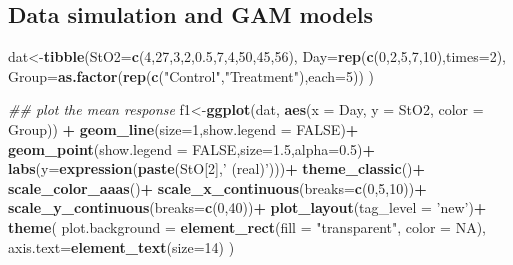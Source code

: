 \documentclass[
]{article}
\newenvironment{Shaded}{\begin{snugshade}}{\end{snugshade}}
\newcommand{\CommentTok}[1]{\textcolor[rgb]{0.56,0.35,0.01}{\textit{#1}}}
\newcommand{\DataTypeTok}[1]{\textcolor[rgb]{0.13,0.29,0.53}{#1}}
\newcommand{\DecValTok}[1]{\textcolor[rgb]{0.00,0.00,0.81}{#1}}
\newcommand{\FloatTok}[1]{\textcolor[rgb]{0.00,0.00,0.81}{#1}}
\newcommand{\KeywordTok}[1]{\textcolor[rgb]{0.13,0.29,0.53}{\textbf{#1}}}
\newcommand{\NormalTok}[1]{#1}
\newcommand{\OperatorTok}[1]{\textcolor[rgb]{0.81,0.36,0.00}{\textbf{#1}}}
\newcommand{\OtherTok}[1]{\textcolor[rgb]{0.56,0.35,0.01}{#1}}
\newcommand{\StringTok}[1]{\textcolor[rgb]{0.31,0.60,0.02}{#1}}
\begin{document}
\hypertarget{data-simulation-and-gam-models}{%
\subsection{Data simulation and GAM models}\label{data-simulation-and-gam-models}}

\begin{Shaded}
\begin{Highlighting}[]
\NormalTok{dat<-}\KeywordTok{tibble}\NormalTok{(}\DataTypeTok{StO2=}\KeywordTok{c}\NormalTok{(}\DecValTok{4}\NormalTok{,}\DecValTok{27}\NormalTok{,}\DecValTok{3}\NormalTok{,}\DecValTok{2}\NormalTok{,}\FloatTok{0.5}\NormalTok{,}\DecValTok{7}\NormalTok{,}\DecValTok{4}\NormalTok{,}\DecValTok{50}\NormalTok{,}\DecValTok{45}\NormalTok{,}\DecValTok{56}\NormalTok{),}
            \DataTypeTok{Day=}\KeywordTok{rep}\NormalTok{(}\KeywordTok{c}\NormalTok{(}\DecValTok{0}\NormalTok{,}\DecValTok{2}\NormalTok{,}\DecValTok{5}\NormalTok{,}\DecValTok{7}\NormalTok{,}\DecValTok{10}\NormalTok{),}\DataTypeTok{times=}\DecValTok{2}\NormalTok{),}
            \DataTypeTok{Group=}\KeywordTok{as.factor}\NormalTok{(}\KeywordTok{rep}\NormalTok{(}\KeywordTok{c}\NormalTok{(}\StringTok{"Control"}\NormalTok{,}\StringTok{"Treatment"}\NormalTok{),}\DataTypeTok{each=}\DecValTok{5}\NormalTok{))}
\NormalTok{            )}


\CommentTok{## plot the mean response}
\NormalTok{f1<-}\KeywordTok{ggplot}\NormalTok{(dat, }\KeywordTok{aes}\NormalTok{(}\DataTypeTok{x =}\NormalTok{ Day, }\DataTypeTok{y =}\NormalTok{ StO2, }\DataTypeTok{color =}\NormalTok{ Group)) }\OperatorTok{+}
\StringTok{    }\KeywordTok{geom_line}\NormalTok{(}\DataTypeTok{size=}\DecValTok{1}\NormalTok{,}\DataTypeTok{show.legend =} \OtherTok{FALSE}\NormalTok{)}\OperatorTok{+}
\StringTok{    }\KeywordTok{geom_point}\NormalTok{(}\DataTypeTok{show.legend =} \OtherTok{FALSE}\NormalTok{,}\DataTypeTok{size=}\FloatTok{1.5}\NormalTok{,}\DataTypeTok{alpha=}\FloatTok{0.5}\NormalTok{)}\OperatorTok{+}
\StringTok{  }\KeywordTok{labs}\NormalTok{(}\DataTypeTok{y=}\KeywordTok{expression}\NormalTok{(}\KeywordTok{paste}\NormalTok{(StO[}\DecValTok{2}\NormalTok{],}\StringTok{' (real)'}\NormalTok{)))}\OperatorTok{+}
\StringTok{  }\KeywordTok{theme_classic}\NormalTok{()}\OperatorTok{+}
\StringTok{  }\KeywordTok{scale_color_aaas}\NormalTok{()}\OperatorTok{+}
\StringTok{    }\KeywordTok{scale_x_continuous}\NormalTok{(}\DataTypeTok{breaks=}\KeywordTok{c}\NormalTok{(}\DecValTok{0}\NormalTok{,}\DecValTok{5}\NormalTok{,}\DecValTok{10}\NormalTok{))}\OperatorTok{+}
\StringTok{    }\KeywordTok{scale_y_continuous}\NormalTok{(}\DataTypeTok{breaks=}\KeywordTok{c}\NormalTok{(}\DecValTok{0}\NormalTok{,}\DecValTok{40}\NormalTok{))}\OperatorTok{+}
\StringTok{  }\KeywordTok{plot_layout}\NormalTok{(}\DataTypeTok{tag_level =} \StringTok{'new'}\NormalTok{)}\OperatorTok{+}
\StringTok{  }\KeywordTok{theme}\NormalTok{(}
    \DataTypeTok{plot.background =} \KeywordTok{element_rect}\NormalTok{(}\DataTypeTok{fill =} \StringTok{"transparent"}\NormalTok{, }\DataTypeTok{color =} \OtherTok{NA}\NormalTok{),}
    \DataTypeTok{axis.text=}\KeywordTok{element_text}\NormalTok{(}\DataTypeTok{size=}\DecValTok{14}\NormalTok{)}
\NormalTok{  )}



\end{Highlighting}
\end{Shaded}
\end{document}
